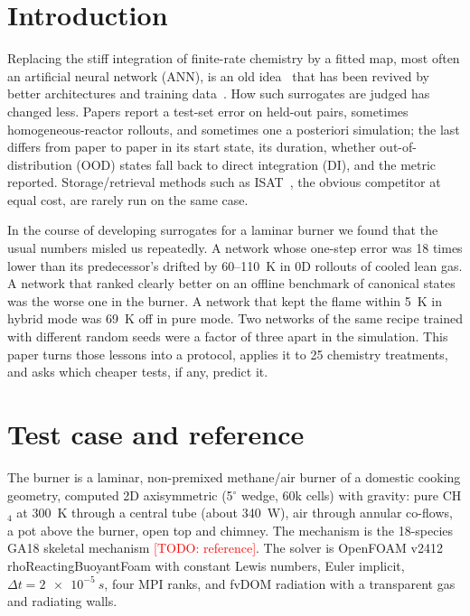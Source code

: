 \documentclass[preprint,review,12pt]{elsarticle}
\newcommand{\todo}[1]{\textcolor{red}{[TODO: #1]}}
\begin{document}
\section{Introduction}
\label{sec:intro}

Replacing the stiff integration of finite-rate chemistry by a fitted map, most often an artificial neural
network (ANN), is an old idea~\cite{christo1996ann,blasco1998ann} that has been revived by better architectures
and training data~\cite{ihme2009ann,sen2010les,franke2017rcce,ding2021hybrid,readshaw2021hybrid,owoyele2022chemnode}.
How such surrogates are judged has changed less. Papers report a test-set error on held-out pairs, sometimes
homogeneous-reactor rollouts, and sometimes one a posteriori simulation; the last differs from paper to paper in
its start state, its duration, whether out-of-distribution (OOD) states fall back to direct integration (DI),
and the metric reported. Storage/retrieval methods such as ISAT~\cite{pope1997isat}, the obvious competitor at
equal cost, are rarely run on the same case.

In the course of developing surrogates for a laminar burner we found that the usual numbers misled us
repeatedly. A network whose one-step error was 18 times lower than its predecessor's drifted by 60--110~K in 0D
rollouts of cooled lean gas. A network that ranked clearly better on an offline benchmark of canonical states
was the worse one in the burner. A network that kept the flame within 5~K in hybrid mode was 69~K off in pure
mode. Two networks of the same recipe trained with different random seeds were a factor of three apart in the
simulation. This paper turns those lessons into a protocol, applies it to 25 chemistry treatments, and asks
which cheaper tests, if any, predict it.

\section{Test case and reference}
\label{sec:case}
The burner is a laminar, non-premixed methane/air burner of a domestic cooking geometry, computed 2D
axisymmetric (5$^\circ$ wedge, 60k cells) with gravity: pure CH$_4$ at 300~K through a central tube (about
340~W), air through annular co-flows, a pot above the burner, open top and chimney. The mechanism is the
18-species GA18 skeletal mechanism \todo{reference}. The solver is OpenFOAM v2412 rhoReactingBuoyantFoam with
constant Lewis numbers, Euler implicit, $\Delta t=\SI{2e-5}{s}$, four MPI ranks, and fvDOM radiation with a
transparent gas and radiating walls.
\end{document}
